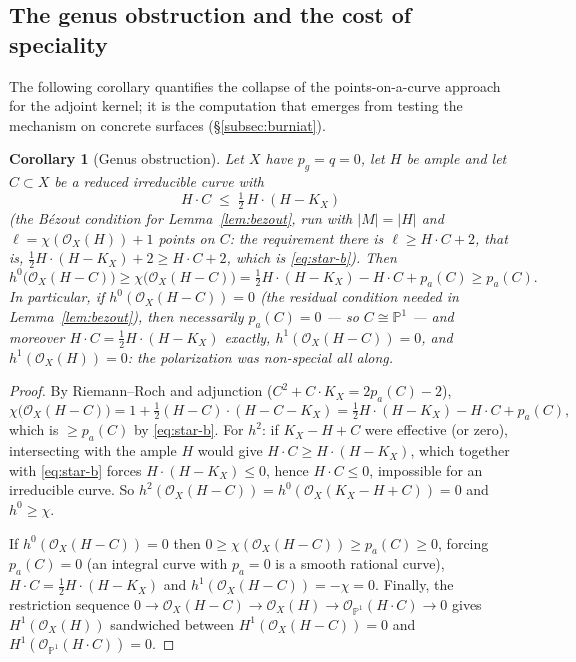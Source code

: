 \documentclass{amsart}
\newtheorem{corollary}[theorem]{Corollary}
\theoremstyle{definition}
\newcommand{\OO}{\mathcal{O}}
\newcommand{\PP}{\mathbb{P}}
\newcommand{\len}{\ell}
\begin{document}
\subsection{The genus obstruction and the cost of speciality}\label{subsec:cost}
The following corollary quantifies the collapse of the points-on-a-curve approach for the adjoint kernel; it is the computation that emerges from testing the mechanism on concrete surfaces (\S\ref{subsec:burniat}).

\begin{corollary}[Genus obstruction]\label{cor:genus}
Let $X$ have $p_g=q=0$, let $H$ be ample and let $C\subset X$ be a reduced irreducible curve with
\begin{equation}\label{eq:star-b}
H\cdot C\;\le\;\tfrac12\,H\cdot(H-K_X)
\end{equation}
\textup{(}the B\'ezout condition for Lemma~\ref{lem:bezout}, run with $|M|=|H|$ and $\len=\chi(\OO_X(H))+1$ points on $C$: the requirement there is $\len\ge H\cdot C+2$, that is, $\tfrac12H\cdot(H-K_X)+2\ge H\cdot C+2$, which is \eqref{eq:star-b}\textup{)}. Then
\[
h^0\bigl(\OO_X(H-C)\bigr)\ge\chi\bigl(\OO_X(H-C)\bigr)=\tfrac12H\cdot(H-K_X)-H\cdot C+p_a(C)\ge p_a(C).
\]
In particular, if $h^0(\OO_X(H-C))=0$ \textup{(}the residual condition needed in Lemma~\ref{lem:bezout}\textup{)}, then necessarily $p_a(C)=0$ --- so $C\cong\PP^1$ --- and moreover $H\cdot C=\tfrac12H\cdot(H-K_X)$ exactly, $h^1(\OO_X(H-C))=0$, and $h^1(\OO_X(H))=0$: the polarization was non-special all along.
\end{corollary}

\begin{proof}
By Riemann--Roch and adjunction ($C^2+C\cdot K_X=2p_a(C)-2$),
\[
\chi\bigl(\OO_X(H-C)\bigr)=1+\tfrac12(H-C)\cdot(H-C-K_X)=\tfrac12H\cdot(H-K_X)-H\cdot C+p_a(C),
\]
which is $\ge p_a(C)$ by \eqref{eq:star-b}. For $h^2$: if $K_X-H+C$ were effective (or zero), intersecting with the ample $H$ would give $H\cdot C\ge H\cdot(H-K_X)$, which together with \eqref{eq:star-b} forces $H\cdot(H-K_X)\le0$, hence $H\cdot C\le 0$, impossible for an irreducible curve. So $h^2(\OO_X(H-C))=h^0(\OO_X(K_X-H+C))=0$ and $h^0\ge\chi$.

If $h^0(\OO_X(H-C))=0$ then $0\ge\chi(\OO_X(H-C))\ge p_a(C)\ge0$, forcing $p_a(C)=0$ (an integral curve with $p_a=0$ is a smooth rational curve), $H\cdot C=\tfrac12H\cdot(H-K_X)$ and $h^1(\OO_X(H-C))=-\chi=0$. Finally, the restriction sequence
$0\to\OO_X(H-C)\to\OO_X(H)\to\OO_{\PP^1}(H\cdot C)\to0$
gives $H^1(\OO_X(H))$ sandwiched between $H^1(\OO_X(H-C))=0$ and $H^1(\OO_{\PP^1}(H\cdot C))=0$.
\end{proof}
\end{document}
